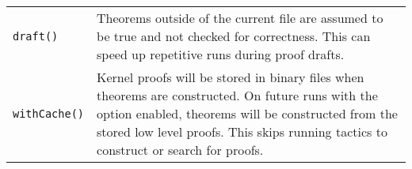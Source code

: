\vspace{2em}
\begin{tabularx}{0.9\columnwidth}{|l|X|}
  \lstinline|draft()| & Theorems outside of the current file are assumed to be true and not checked for correctness. This can speed up repetitive runs during proof drafts.
  \\[4ex]
  \lstinline|withCache()| & Kernel proofs will be stored in binary files when theorems are constructed. On future runs with the option enabled, theorems will be constructed from the stored low level proofs. This skips running tactics to construct or search for proofs.\\
  
\end{tabularx}